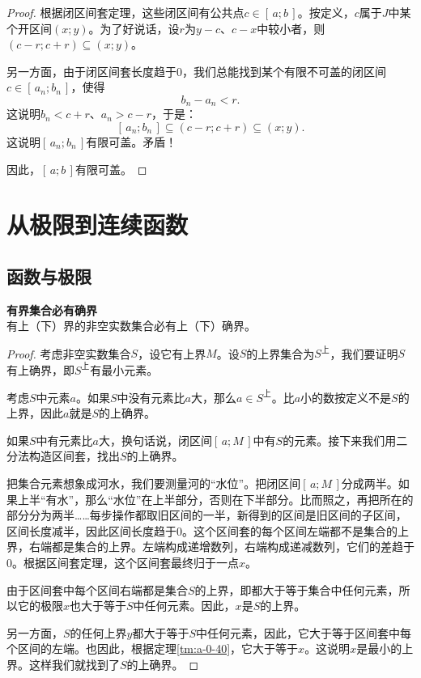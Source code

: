 \documentclass[12pt,UTF8,fontset=none]{ctexbook}
\begin{document}
\begin{appendix}
\begin{proof}
    根据闭区间套定理，这些闭区间有公共点$c\in[\,a; b\,]$。按定义，$c$属于$J$中某个开区间$(x; y)$。为了好说话，设$r$为$y-c$、$c-x$中较小者，则$(c-r; c+r)\subseteq (x; y)$。

    另一方面，由于闭区间套长度趋于$0$，我们总能找到某个有限不可盖的闭区间$c\in [\,a_n; b_n\,]$，使得
    $$ b_n - a_n < r.$$
    这说明$b_n < c+r$、$a_n>c-r$，于是：
    $$[\,a_n; b_n\,] \subseteq (c-r; c+r) \subseteq (x; y). $$
    这说明$[\,a_n; b_n\,]$有限可盖。矛盾！

    因此，$[\,a; b\,]$有限可盖。

\end{proof}

\chapter{从极限到连续函数}
\section{函数与极限}
\begin{tm}{\textbf{有界集合必有确界}}\label{tm:b-0-0}\\
    有上（下）界的非空实数集合必有上（下）确界。
\end{tm}
\begin{proof}
    考虑非空实数集合$S$，设它有上界$M$。设$S$的上界集合为$S^{\text{上}}$，我们要证明$S$有上确界，即$S^{\text{上}}$有最小元素。

    考虑$S$中元素$a$。如果$S$中没有元素比$a$大，那么$a\in S^{\text{上}}$。比$a$小的数按定义不是$S$的上界，因此$a$就是$S$的上确界。

    如果$S$中有元素比$a$大，换句话说，闭区间$[\,a; M\,]$中有$S$的元素。接下来我们用二分法构造区间套，找出$S$的上确界。

    把集合元素想象成河水，我们要测量河的“水位”。把闭区间$[\,a; M\,]$分成两半。如果上半“有水”，那么“水位”在上半部分，否则在下半部分。比而照之，再把所在的部分分为两半……每步操作都取旧区间的一半，新得到的区间是旧区间的子区间，区间长度减半，因此区间长度趋于$0$。这个区间套的每个区间左端都不是集合的上界，右端都是集合的上界。左端构成递增数列，右端构成递减数列，它们的差趋于$0$。根据区间套定理，这个区间套最终归于一点$x$。

    由于区间套中每个区间右端都是集合$S$的上界，即都大于等于集合中任何元素，所以它的极限$x$也大于等于$S$中任何元素。因此，$x$是$S$的上界。
    
    另一方面，$S$的任何上界$y$都大于等于$S$中任何元素，因此，它大于等于区间套中每个区间的左端。也因此，根据定理\ref{tm:a-0-40}，它大于等于$x$。这说明$x$是最小的上界。这样我们就找到了$S$的上确界。


\end{proof}
\end{appendix}
\end{document}
